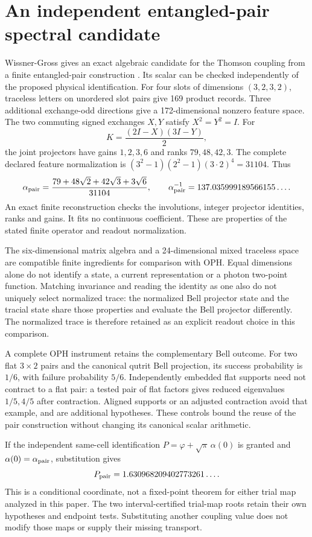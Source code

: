 \section{An independent entangled-pair spectral candidate}
\label{sec:entangled-pair-alpha}

Wissner-Gross gives an exact algebraic candidate for the Thomson coupling
from a finite entangled-pair construction \cite{wissnergross2026pairs}.
Its scalar can be checked independently of the proposed physical
identification. For four slots of dimensions \((3,2,3,2)\), traceless
letters on unordered slot pairs give 169 product records. Three additional
exchange-odd directions give a 172-dimensional nonzero feature space.
The two commuting signed exchanges \(X,Y\) satisfy \(X^2=Y^2=I\). For
\[
 K=\frac{(2I-X)(3I-Y)}2,
\]
the joint projectors have gains \(1,2,3,6\) and ranks \(79,48,42,3\).
The complete declared feature normalization is
\((3^2-1)(2^2-1)(3\cdot2)^4=31104\). Thus
\[
 \alpha_{\rm pair}
 =\frac{79+48\sqrt2+42\sqrt3+3\sqrt6}{31104},\qquad
 \alpha_{\rm pair}^{-1}=137.035999189566155\ldots.
\]
An exact finite reconstruction checks the involutions, integer projector
identities, ranks and gains. It fits no continuous coefficient. These are
properties of the stated finite operator and readout normalization.

The six-dimensional matrix algebra and a 24-dimensional mixed traceless
space are compatible finite ingredients for comparison with OPH. Equal
dimensions alone do not identify a state, a current representation or a
photon two-point function. Matching invariance and reading the identity as
one also do not uniquely select normalized trace: the normalized Bell
projector state and the tracial state share those properties and evaluate
the Bell projector differently. The normalized trace is therefore retained
as an explicit readout choice in this comparison.

A complete OPH instrument retains the complementary Bell outcome. For two
flat \(3\times2\) pairs and the canonical qutrit Bell projection, its
success probability is \(1/6\), with failure probability \(5/6\).
Independently embedded flat supports need not contract to a flat pair: a
tested pair of flat factors gives reduced eigenvalues \(1/5,4/5\) after
contraction. Aligned supports or an adjusted contraction avoid that example,
and are additional hypotheses. These controls bound the reuse of the pair
construction without changing its canonical scalar arithmetic.

If the independent same-cell identification
\(P=\varphi+\sqrt\pi\,\alpha(0)\) is granted and
\(\alpha(0)=\alpha_{\rm pair}\), substitution gives
\[
 P_{\rm pair}=1.630968209402773261\ldots.
\]
This is a conditional coordinate, not a fixed-point theorem for either
trial map analyzed in this paper. The two interval-certified trial-map
roots retain their own hypotheses and endpoint tests. Substituting another
coupling value does not modify those maps or supply their missing transport.

